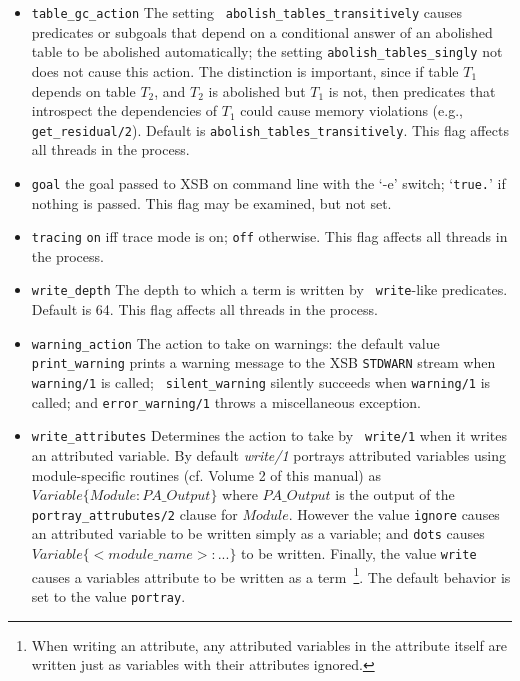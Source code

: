 \begin{description}
\begin{itemize}
%
\item {\tt table\_gc\_action} The setting {\tt
  abolish\_tables\_transitively} causes predicates or subgoals that
  depend on a conditional answer of an abolished table to be abolished
  automatically; the setting {\tt abolish\_tables\_singly} not does
  not cause this action.  The distinction is important, since if table
  $T_1$ depends on table $T_2$, and $T_2$ is abolished but $T_1$ is
  not, then predicates that introspect the dependencies of $T_1$ could
  cause memory violations (e.g., {\tt get\_residual/2}).  Default is
  {\tt abolish\_tables\_transitively}.  This flag affects all threads
  in the process.
%
\item {\tt goal}  the goal passed to XSB on command line with the `-e'
switch; `{\tt true.}' if nothing is passed.  This flag may be
examined, but not set. 
%
\item {\tt tracing}  {\tt on} iff trace mode is on; {\tt off}
otherwise. This flag affects all threads in the process. 
%
\item {\tt write\_depth}  The depth to which a term is written by {\tt
  write}-like predicates.  Default is 64.  This flag affects all
threads in the process.  

\item {\tt warning\_action} The action to take on warnings: the
  default value {\tt print\_warning} prints a warning message to the
  XSB {\tt STDWARN} stream when {\tt warning/1} is called; {\tt
    silent\_warning} silently succeeds when {\tt warning/1} is called;
  and {\tt error\_warning/1} throws a miscellaneous exception.

\item {\tt write\_attributes} Determines the action to take by {\tt
  write/1} when it writes an attributed variable.  By default {\em
  write/1} portrays attributed variables using module-specific
  routines (cf. Volume 2 of this manual) as $Variable \{ Module :
  PA\_Output\}$ where $PA\_Output$ is the output of the {\tt
    portray\_attrubutes/2} clause for $Module$.  However the value
  {\tt ignore} causes an attributed variable to be written simply as a
  variable; and {\tt dots} causes $Variable \{ <module\_name> : ...\}$
  to be written.  Finally, the value {\tt write} causes a variables
  attribute to be written as a term~\footnote{When writing an
    attribute, any attributed variables in the attribute itself are
    written just as variables with their attributes ignored.}.  The
  default behavior is set to the value {\tt portray}.


\end{itemize}
\end{description}
